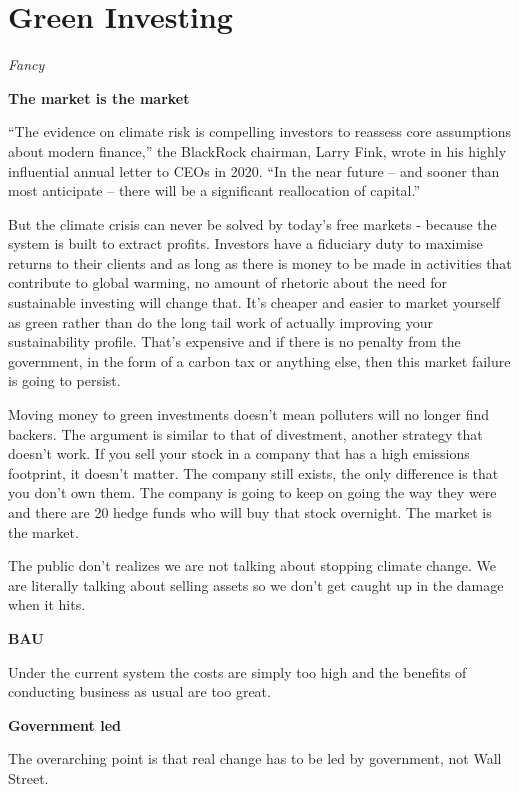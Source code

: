 \documentclass[
]{book}
\begin{document}
\hypertarget{green-investing}{%
\section{Green Investing}\label{green-investing}}

\emph{Fancy}

\textbf{The market is the market}

``The evidence on climate risk is compelling investors to reassess core assumptions about modern finance,'' the BlackRock chairman, Larry Fink, wrote in his highly influential annual letter to CEOs in 2020. ``In the near future -- and sooner than most anticipate -- there will be a significant reallocation of capital.''

But the climate crisis can never be solved by today's free markets -
because the system is built to extract profits.
Investors have a fiduciary duty to maximise returns to their clients and as long as there is money to be made in activities that contribute to global warming, no amount of rhetoric about the need for sustainable investing will change that.
It's cheaper and easier to market yourself as green rather than do the long tail work of actually improving your sustainability profile.
That's expensive and if there is no penalty from the government, in the form of a carbon tax or anything else, then this market failure is going to persist.

Moving money to green investments doesn't mean polluters will no longer find backers.
The argument is similar to that of divestment, another strategy that doesn't work.
If you sell your stock in a company that has a high emissions footprint,
it doesn't matter.
The company still exists, the only difference is that you don't own them.
The company is going to keep on going the way they were and
there are 20 hedge funds who will buy that stock overnight.
The market is the market.

The public don't realizes we are not talking about stopping climate change.
We are literally talking about selling assets so we don't get caught
up in the damage when it hits.

\textbf{BAU}

Under the current system the costs are simply too high and
the benefits of conducting business as usual are too great.

\textbf{Government led}

The overarching point is that real change has to be led by government, not Wall Street.
\end{document}
